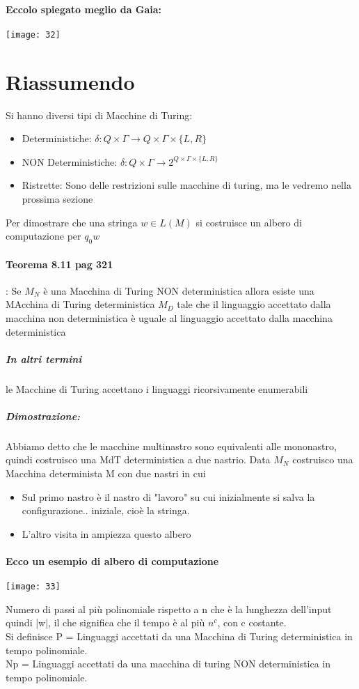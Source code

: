 \documentclass[12pt, a4paper, openany, oneside]{book}
\begin{document}
\paragraph{Eccolo spiegato meglio da Gaia:}
\begin{center}
\texttt{[image: 32]}
\end{center}
\section{Riassumendo }
Si hanno diversi tipi di Macchine di Turing:
\begin{itemize}
    	\item Deterministiche: $\delta : Q \times \Gamma \to Q \times \Gamma \times \{L, R\}$
    	\item NON Deterministiche: $\delta : Q \times \Gamma \to 2^{Q \times \Gamma \times \{L, R\}} $
    	\item Ristrette: Sono delle restrizioni sulle macchine di turing, ma 
    	le vedremo nella prossima sezione
\end{itemize}    
Per dimostrare che una stringa $w \in L(M)$ si costruisce un albero di computazione
per $q_{0} w$
\paragraph{Teorema 8.11 pag 321}: Se $M_{N}$ è una Macchina di Turing NON deterministica
allora esiste una MAcchina di Turing deterministica $M_{D}$ tale che il linguaggio
accettato dalla macchina non deterministica è uguale al linguaggio accettato 
dalla macchina deterministica
\subparagraph{In altri termini }le Macchine di Turing accettano i linguaggi 
ricorsivamente enumerabili
\subparagraph{Dimostrazione: }Abbiamo detto che le macchine multinastro sono
equivalenti alle mononastro, quindi costruisco una MdT deterministica a due 
nastrio. Data $M_{N}$ costruisco una Macchina determinista M con due nastri in cui
\begin{itemize}
 		\item Sul primo nastro è il nastro di "lavoro" su cui inizialmente si
 		salva la configurazione.. iniziale, cioè la stringa.
 		\item L'altro visita in ampiezza questo albero
 \end{itemize} 		
\paragraph{Ecco un esempio di albero di computazione}
\begin{center}
	\texttt{[image: 33]}
\end{center}
Numero di passi al più polinomiale rispetto a n che è la lunghezza dell'input 
quindi |w|, il che significa che il tempo è al più $n^{c}$, con c costante.\\
Si definisce P = Linguaggi accettati da una Macchina di Turing deterministica
 in tempo polinomiale.
\\Np = Linguaggi accettati da una macchina di turing NON deterministica in tempo
polinomiale.
\end{document}

